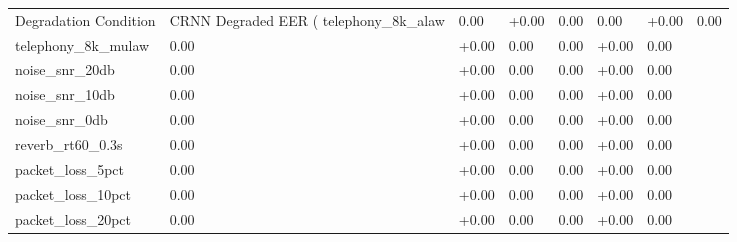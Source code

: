 \begin{tabular}{lllllll}
\toprule
Degradation Condition & CRNN Degraded EER (%
\midrule
telephony_8k_alaw & 0.00 & +0.00 & 0.00 & 0.00 & +0.00 & 0.00 \\
telephony_8k_mulaw & 0.00 & +0.00 & 0.00 & 0.00 & +0.00 & 0.00 \\
noise_snr_20db & 0.00 & +0.00 & 0.00 & 0.00 & +0.00 & 0.00 \\
noise_snr_10db & 0.00 & +0.00 & 0.00 & 0.00 & +0.00 & 0.00 \\
noise_snr_0db & 0.00 & +0.00 & 0.00 & 0.00 & +0.00 & 0.00 \\
reverb_rt60_0.3s & 0.00 & +0.00 & 0.00 & 0.00 & +0.00 & 0.00 \\
packet_loss_5pct & 0.00 & +0.00 & 0.00 & 0.00 & +0.00 & 0.00 \\
packet_loss_10pct & 0.00 & +0.00 & 0.00 & 0.00 & +0.00 & 0.00 \\
packet_loss_20pct & 0.00 & +0.00 & 0.00 & 0.00 & +0.00 & 0.00 \\
\bottomrule
\end{tabular}
